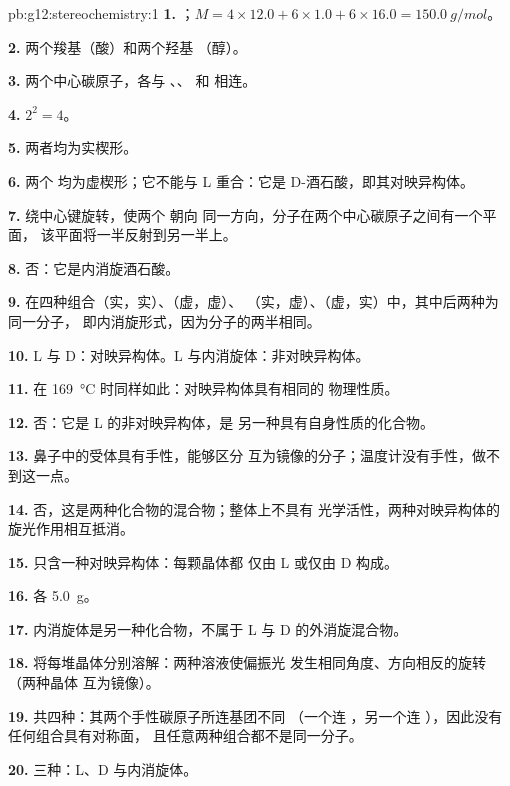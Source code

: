 \begin{solution}{pb:g12:stereochemistry:1}
\textbf{1.} ；$M = 4 \times 12.0 + 6 \times 1.0 + 6 \times 16.0
= \qty{150.0}{g/mol}$。

\textbf{2.} 两个羧基（酸）和两个羟基
（醇）。

\textbf{3.} 两个中心碳原子，各与 、、
 和  相连。

\textbf{4.} $2^2 = 4$。

\textbf{5.} 两者均为实楔形。

\textbf{6.} 两个  均为虚楔形；它不能与
L 重合：它是 D-酒石酸，即其对映异构体。

\textbf{7.} 绕中心键旋转，使两个  朝向
同一方向，分子在两个中心碳原子之间有一个平面，
该平面将一半反射到另一半上。

\textbf{8.} 否：它是内消旋酒石酸。

\textbf{9.} 在四种组合（实，实）、（虚，虚）、
（实，虚）、（虚，实）中，其中后两种为同一分子，
即内消旋形式，因为分子的两半相同。

\textbf{10.} L 与 D：对映异构体。L 与内消旋体：非对映异构体。

\textbf{11.} 在 \qty{169}{\celsius} 时同样如此：对映异构体具有相同的
物理性质。

\textbf{12.} 否：它是 L 的非对映异构体，是
另一种具有自身性质的化合物。

\textbf{13.} 鼻子中的受体具有手性，能够区分
互为镜像的分子；温度计没有手性，做不到这一点。

\textbf{14.} 否，这是两种化合物的混合物；整体上不具有
光学活性，两种对映异构体的旋光作用相互抵消。

\textbf{15.} 只含一种对映异构体：每颗晶体都
仅由 L 或仅由 D 构成。

\textbf{16.} 各 \qty{5.0}{g}。

\textbf{17.} 内消旋体是另一种化合物，不属于
L 与 D 的外消旋混合物。

\textbf{18.} 将每堆晶体分别溶解：两种溶液使偏振光
发生相同角度、方向相反的旋转（两种晶体
互为镜像）。

\textbf{19.} 共四种：其两个手性碳原子所连基团不同
（一个连 ，另一个连 ），因此没有任何组合具有对称面，
且任意两种组合都不是同一分子。

\textbf{20.} 三种：L、D 与内消旋体。
\end{solution}
